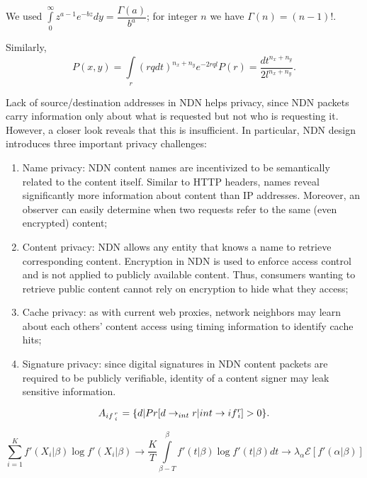 \documentclass[12pt]{spieman}
\begin{document}
\begin{spacing}{2}
We used $\int\limits_{0}^{\infty} z^{a-1} e^{-bz} dy = \dfrac{\Gamma(a)}{b^a}$; for integer $n$ we have $\Gamma(n) = (n - 1)!$.

Similarly,
\begin{equation}
\label{3}
P(x,y) = \int\limits_{r}^{} (rq dt)^{n_{x}+n_{y}} e^{-2rql} P(r) = \frac{dt^{n_{x}+n_{y}}}{2l^{n_{x}+n_{y}}}.
\end{equation}

Lack of source/destination addresses in NDN helps privacy, since NDN packets carry information only about what is requested but not who is requesting it. However, a closer look reveals that this is insufficient. In particular, NDN design introduces three important privacy challenges: 

\begin{enumerate}
\item Name privacy: NDN content names are incentivized to be semantically related to the content itself. Similar to HTTP headers, names reveal significantly more information about content than IP addresses. Moreover, an observer can easily determine when two requests refer to the same (even encrypted) content;
\item Content privacy: NDN allows any entity that knows a name to retrieve corresponding content. Encryption in NDN is used to enforce access control and is not applied to publicly available content. Thus, consumers wanting to retrieve public content cannot rely on encryption to hide what they access;
\item Cache privacy: as with current web proxies, network neighbors may learn about each others’ content access using timing information to identify cache hits;
\item Signature privacy: since digital signatures in NDN content packets are required to be publicly verifiable, identity of a content signer may leak sensitive information.
\end{enumerate}

\begin{equation}
\label{4}
A_{if\genfrac{}{}{0pt}{}{r}{i}} = \{ d | Pr [d \rightarrow_{int} r | int \rightarrow if\substack{r\\i}] > 0\}.
\end{equation}

\begin{equation}
\label{5}
\sum_{i=1}^K f'(X_i|\beta) \log f'(X_i|\beta) \rightarrow \frac{K}{T} \int\limits_{\beta - T}^{\beta} f'(t|\beta) \log f'(t|\beta)dt \rightarrow \lambda_\alpha \mathcal{E}[f'(\alpha|\beta)]
\end{equation}

\end{spacing}
\end{document}
